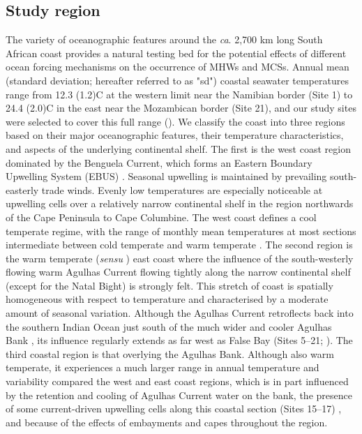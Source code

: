 \documentclass[a4paper,10pt,review]{elsarticle}
\begin{document}
\subsection{Study region}
The variety of oceanographic features around the \emph{ca}. 2,700 km long South African coast provides a natural testing bed for the potential effects of different ocean forcing mechanisms on the occurrence of MHWs and MCSs. Annual mean (standard deviation; hereafter referred to as "sd") coastal seawater temperatures range from 12.3 (1.2)\degree C at the western limit near the Namibian border (Site 1) to 24.4 (2.0)\degree C in the east near the Mozambican border (Site 21), and our study sites were selected to cover this full range (). We classify the coast into three regions based on their major oceanographic features, their temperature characteristics, and aspects of the underlying continental shelf. The first is the west coast region dominated by the Benguela Current, which forms an Eastern Boundary Upwelling System (EBUS) \citep{Hutchings2009}. Seasonal upwelling is maintained by prevailing south-easterly trade winds. Evenly low temperatures are especially noticeable at upwelling cells over a relatively narrow continental shelf in the region northwards of the Cape Peninsula to Cape Columbine. The west coast defines a cool temperate regime, with the range of monthly mean temperatures at most sections intermediate between cold temperate and warm temperate \citep{Luning1990}. The second region is the warm temperate (\emph{sensu}  \cite{Luning1990}) east coast where the influence of the south-westerly flowing warm Agulhas Current flowing tightly along the narrow continental shelf (except for the Natal Bight) is strongly felt. This stretch of coast is spatially homogeneous with respect to temperature and characterised by a moderate amount of seasonal variation. Although the Agulhas Current retroflects back into the southern Indian Ocean \citep{Hutchings2009} just south of the much wider and cooler Agulhas Bank \citep{Roberts2005}, its influence regularly extends as far west as False Bay (Sites 5--21; ). The third coastal region is that overlying the Agulhas Bank. Although also warm temperate, it experiences a much larger range in annual temperature and variability compared the west and east coast regions, which is in part influenced by the retention and cooling of Agulhas Current water on the bank, the presence of some current-driven upwelling cells along this coastal section (Sites 15--17) \citep{Roberts2005}, and because of the effects of embayments and capes throughout the region.
\end{document}
